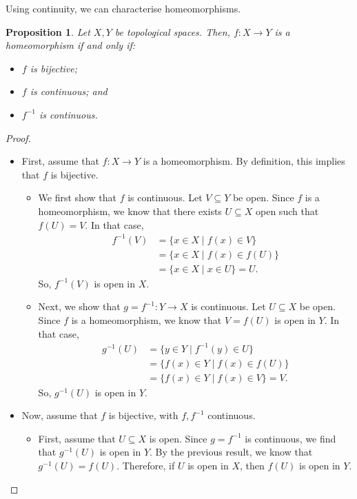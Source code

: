 \documentclass[a4paper, openany]{memoir}
\theoremstyle{definition}
\theoremstyle{plain}
\newtheorem{proposition}[definition]{Proposition}
\begin{document}
Using continuity, we can characterise homeomorphisms.
\begin{proposition}
Let $X, Y$ be topological spaces. Then, $f: X \to Y$ is a homeomorphism if and only if:
\begin{itemize}
    \item $f$ is bijective;
    \item $f$ is continuous; and
    \item $f^{-1}$ is continuous.
\end{itemize}
\end{proposition}
\begin{proof}
\hspace*{0pt}
\begin{itemize}
    \item First, assume that $f: X \to Y$ is a homeomorphism. By definition, this implies that $f$ is bijective.
    \begin{itemize}
        \item We first show that $f$ is continuous. Let $V \subseteq Y$ be open. Since $f$ is a homeomorphism, we know that there exists $U \subseteq X$ open such that $f(U) = V$. In that case,
        \begin{align*}
            f^{-1}(V) &= \{x \in X \mid f(x) \in V\} \\
            &= \{x \in X \mid f(x) \in f(U)\} \\
            &= \{x \in X \mid x \in U\} = U.
        \end{align*}
        So, $f^{-1}(V)$ is open in $X$.
        
        \item Next, we show that $g = f^{-1}: Y \to X$ is continuous. Let $U \subseteq X$ be open. Since $f$ is a homeomorphism, we know that $V = f(U)$ is open in $Y$. In that case, 
        \begin{align*}
            g^{-1}(U) &= \{y \in Y \mid f^{-1}(y) \in U\} \\
            &= \{f(x) \in Y \mid f(x) \in f(U)\} \\
            &= \{f(x) \in Y \mid f(x) \in V\} = V.
        \end{align*}
        So, $g^{-1}(U)$ is open in $Y$.
    \end{itemize}
    
    \item Now, assume that $f$ is bijective, with $f, f^{-1}$ continuous. 
    \begin{itemize}
        \item First, assume that $U \subseteq X$ is open. Since $g = f^{-1}$ is continuous, we find that $g^{-1}(U)$ is open in $Y$. By the previous result, we know that $g^{-1}(U) = f(U)$. Therefore, if $U$ is open in $X$, then $f(U)$ is open in $Y$.
        

\end{itemize}
\end{itemize}
\end{proof}
\end{document}
